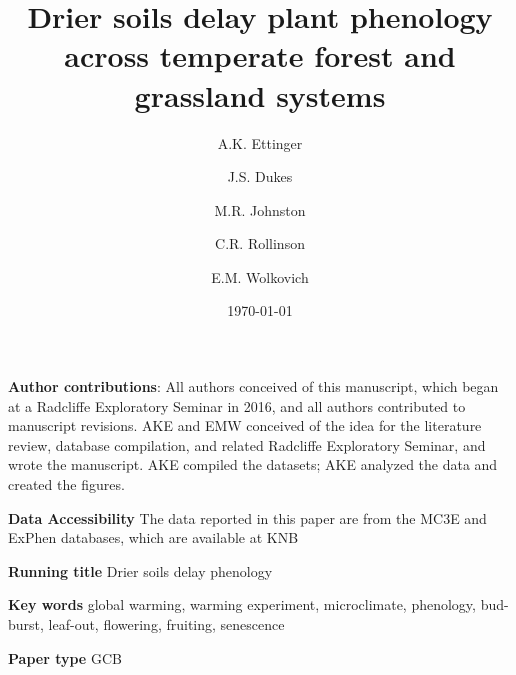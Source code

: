 \documentclass{article}
\begin{document}



\title{Drier soils delay plant phenology across temperate forest and grassland systems} 
\author[1,2,a]{A.K. Ettinger}
\author[3,b]{J.S. Dukes}
\author[4,c]{M.R. Johnston}
\author[5,d]{C.R. Rollinson}
\author[1,4,6,e]{E.M. Wolkovich}









\date{\today}
\maketitle 
\textbf{Author contributions}: All authors conceived of this manuscript, which began at a Radcliffe Exploratory Seminar in 2016, and all authors contributed to manuscript revisions. AKE and EMW conceived of the idea for the literature review, database compilation, and related Radcliffe Exploratory Seminar, and wrote the manuscript. AKE compiled the datasets; AKE analyzed the data and created the figures.

\textbf{Data Accessibility} 
The data reported in this paper are from the MC3E and ExPhen databases, which are available at KNB \citep{ettinger2018,ettinger2022}

\textbf{Running title} Drier soils delay phenology

\textbf{Key words} global warming, warming experiment, microclimate, phenology, bud-burst, leaf-out, flowering, fruiting, senescence 


\textbf{Paper type} GCB %


\end{document}
